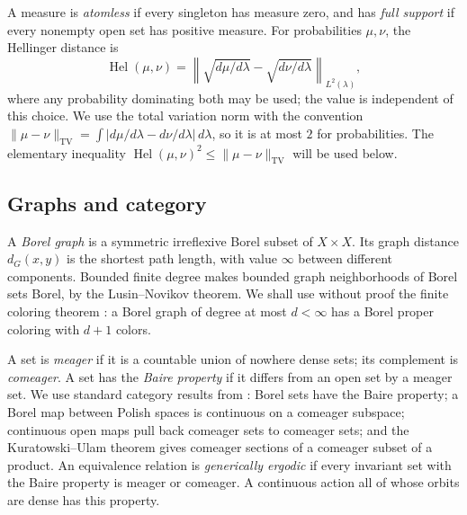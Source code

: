 \documentclass[11pt]{article}
\numberwithin{equation}{section}
\theoremstyle{definition}
\newcommand{\Hel}{\operatorname{Hel}}
\begin{document}
A measure is \emph{atomless} if every singleton has measure zero,
and has \emph{full support} if every nonempty open set has positive
measure. For probabilities $\mu,\nu$, the Hellinger distance is
\[
 \Hel(\mu,\nu)=
 \left\|\sqrt{d\mu/d\lambda}-\sqrt{d\nu/d\lambda}\right\|_{L^2(\lambda)},
\]
where any probability dominating both may be used; the value is
independent of this choice. We use the total variation norm with
the convention
$\|\mu-\nu\|_{\mathrm{TV}}=\int|d\mu/d\lambda-d\nu/d\lambda|\,d\lambda$,
so it is at most $2$ for probabilities.
The elementary inequality
$\Hel(\mu,\nu)^2\le\|\mu-\nu\|_{\mathrm{TV}}$
will be used below.

\subsection{Graphs and category}
A \emph{Borel graph} is a symmetric irreflexive Borel subset of
$X\times X$. Its graph distance $d_G(x,y)$ is the shortest path
length, with value $\infty$ between different components.
Bounded finite degree makes bounded graph neighborhoods of Borel
sets Borel, by the Lusin--Novikov theorem.
We shall use without proof the finite coloring theorem
\cite[Proposition~4.6]{KST}: a Borel graph of degree at most
$d<\infty$ has a Borel proper coloring with $d+1$ colors.

A set is \emph{meager} if it is a countable union of nowhere dense
sets; its complement is \emph{comeager}.
A set has the \emph{Baire property} if it differs from an open set
by a meager set. We use standard category results from \cite{Gao}:
Borel sets have the Baire property; a Borel map between Polish
spaces is continuous on a comeager subspace; continuous open maps
pull back comeager sets to comeager sets; and the Kuratowski--Ulam
theorem gives comeager sections of a comeager subset of a product.
An equivalence relation is \emph{generically ergodic} if every
invariant set with the Baire property is meager or comeager.
A continuous action all of whose orbits are dense has this property.
\end{document}
